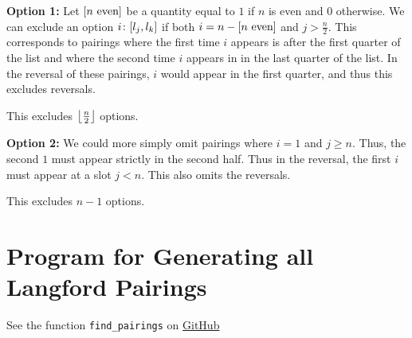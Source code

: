 \documentclass[letterpaper]{article}
\begin{document}
\textbf{Option 1:}
Let $\bqty{n \text{ even}}$ be a quantity equal to $1$ if $n$ is even and $0$ otherwise.
We can exclude an option $i\colon \bqty{l_{j}, l_{k}}$ if both $i = n - \bqty{n \text{ even}}$ and $j > \frac{n}{2}$.
This corresponds to pairings where the first time $i$ appears is after the first quarter of the list and where the second time $i$ appears in in the last quarter of the list.
In the reversal of these pairings, $i$ would appear in the first quarter, and thus this excludes reversals.

This excludes $\left\lfloor \frac{n}{2} \right\rfloor$ options.

\textbf{Option 2:}
We could more simply omit pairings where $i = 1$ and $j \geq n$.
Thus, the second $1$ must appear strictly in the second half.
Thus in the reversal, the first $i$ must appear at a slot $j < n$.
This also omits the reversals.

This excludes $n - 1$ options.

\section*{Program for Generating all Langford Pairings}

See the function \texttt{find\_pairings} on \href{}{GitHub}

\printbibliography
\end{document}
